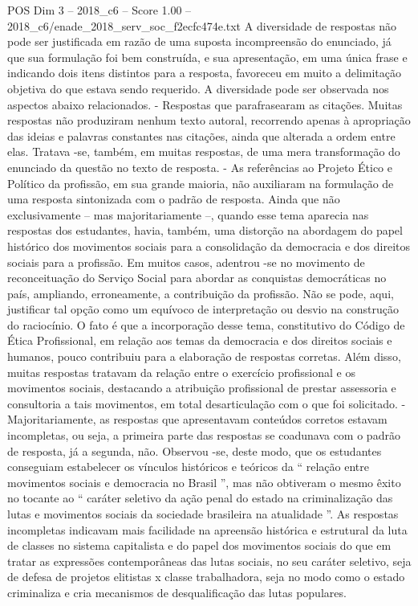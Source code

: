 \begin{textsample}{POS Dim 3 – 2018\_c6 – Score 1.00 – 2018\_c6/enade\_2018\_serv\_soc\_f2ecfc474e.txt}
A diversidade de respostas não pode ser justificada em razão de uma suposta incompreensão do enunciado, já que sua formulação foi bem construída, e sua apresentação, em uma única frase e indicando dois itens distintos para a resposta, favoreceu em muito a delimitação objetiva do que estava sendo requerido.
A diversidade pode ser observada nos aspectos abaixo relacionados. - Respostas que parafrasearam as citações.
Muitas respostas não produziram nenhum texto autoral, recorrendo apenas à apropriação das ideias e palavras constantes nas citações, ainda que alterada a ordem entre elas.
Tratava -se, também, em muitas respostas, de uma mera transformação do enunciado da questão no texto de resposta. - As referências ao Projeto Ético e Político da profissão, em sua grande maioria, não auxiliaram na formulação de uma resposta sintonizada com o padrão de resposta.
Ainda que não exclusivamente – mas majoritariamente –, quando esse tema aparecia nas respostas dos estudantes, havia, também, uma distorção na abordagem do papel histórico dos movimentos sociais para a consolidação da democracia e dos direitos sociais para a profissão.
Em muitos casos, adentrou -se no movimento de reconceituação do Serviço Social para abordar as conquistas democráticas no país, ampliando, erroneamente, a contribuição da profissão.
Não se pode, aqui, justificar tal opção como um equívoco de interpretação ou desvio na construção do raciocínio.
O fato é que a incorporação desse tema, constitutivo do Código de Ética Profissional, em relação aos temas da democracia e dos direitos sociais e humanos, pouco contribuiu para a elaboração de respostas corretas.
Além disso, muitas respostas tratavam da relação entre o exercício profissional e os movimentos sociais, destacando a atribuição profissional de prestar assessoria e consultoria a tais movimentos, em total desarticulação com o que foi solicitado. - Majoritariamente, as respostas que apresentavam conteúdos corretos estavam incompletas, ou seja, a primeira parte das respostas se coadunava com o padrão de resposta, já a segunda, não.
Observou -se, deste modo, que os estudantes conseguiam estabelecer os vínculos históricos e teóricos da “ relação entre movimentos sociais e democracia no Brasil ”, mas não obtiveram o mesmo êxito no tocante ao “ caráter seletivo da ação penal do estado na criminalização das lutas e movimentos sociais da sociedade brasileira na atualidade ”.
As respostas incompletas indicavam mais facilidade na apreensão histórica e estrutural da luta de classes no sistema capitalista e do papel dos movimentos sociais do que em tratar as expressões contemporâneas das lutas sociais, no seu caráter seletivo, seja de defesa de projetos elitistas x classe trabalhadora, seja no modo como o estado criminaliza e cria mecanismos de desqualificação das lutas populares.

\end{textsample}
